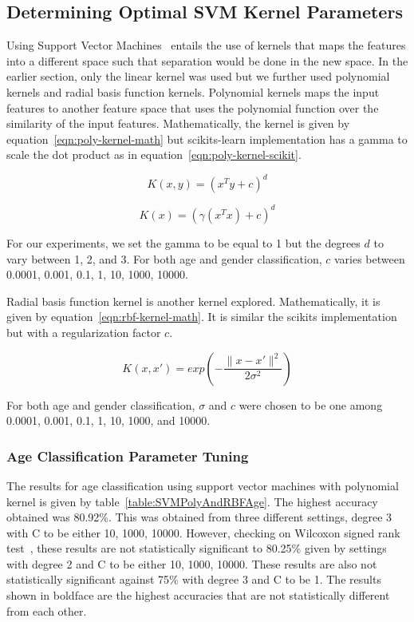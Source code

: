 \documentclass[a4paper]{llncs}
\begin{document}
\subsection{Determining Optimal SVM Kernel Parameters}
Using Support Vector Machines~\cite{cortes1995support} entails the use of kernels that maps the features into a different space such that separation would be done in the new space. In the earlier section, only the linear kernel was used but we further used polynomial kernels and radial basis function kernels. Polynomial kernels maps the input features to another feature space that uses the polynomial function over the similarity of the input features. Mathematically, the kernel is given by equation~\ref{eqn:poly-kernel-math} but scikits-learn implementation has a gamma to scale the dot product as in equation~\ref{eqn:poly-kernel-scikit}.

\begin{equation}
K(x,y) = (x^Ty + c)^d
\label{eqn:poly-kernel-math}
\end{equation}

\begin{equation}
K(x) = (\gamma(x^Tx)+c)^d
\label{eqn:poly-kernel-scikit}
\end{equation}

For our experiments, we set the gamma to be equal to 1 but the degrees $d$ to vary between 1, 2, and 3. For both age and gender classification, $c$ varies between 0.0001, 0.001, 0.1, 1, 10, 1000, 10000.   

Radial basis function kernel is another kernel explored. Mathematically, it is given by equation~\ref{eqn:rbf-kernel-math}. It is similar the scikits implementation but with a regularization factor $c$. 

\begin{equation}
K(x,x')= exp\left( -\frac{\parallel x-x'\parallel^2}{2\sigma^2} \right)
\label{eqn:rbf-kernel-math}
\end{equation} 

For both age and gender classification, $\sigma$ and $c$ were chosen to be one among 0.0001, 0.001, 0.1, 1, 10, 1000, and 10000.

\subsubsection{Age Classification Parameter Tuning}
The results for age classification using support vector machines with polynomial kernel is given by table~\ref{table:SVMPolyAndRBFAge}. The highest accuracy obtained was 80.92\%. This was obtained from three different settings, degree 3 with C to be either 10, 1000, 10000. However, checking on Wilcoxon signed rank test~\cite{wilcoxon1945individual}, these results are not statistically significant to 80.25\% given by settings with degree 2 and C to be either 10, 1000, 10000. These results are also not statistically significant against 75\% with degree 3 and C to be 1. The results shown in boldface are the highest accuracies that are not statistically different from each other. 
\end{document}
